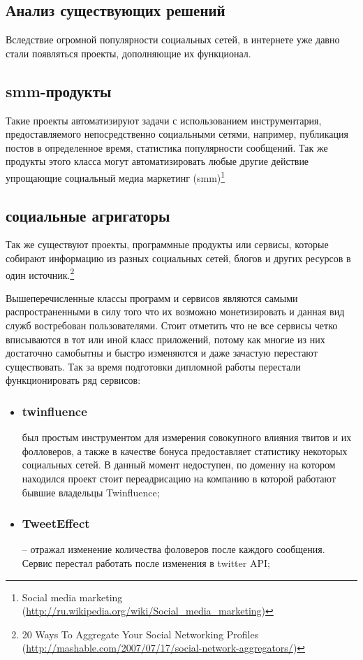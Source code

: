 \begin{chap1}
\section{Анализ существующих решений}
Вследствие огромной популярности социальных сетей, в интернете уже давно стали появляться проекты, дополняющие их функционал. 
\subsection{smm-продукты}
Такие проекты автоматизируют задачи с использованием инструментария, предоставляемого непосредственно социальными сетями, например, публикация постов в определенное время, статистика популярности сообщений. Так же продукты этого класса могут автоматизировать любые другие действие упрощающие социальный медиа маркетинг (smm)\footnote{Social media marketing (\url{http://ru.wikipedia.org/wiki/Social_media_marketing})}
\subsection{социальные агригаторы}
Так же существуют проекты, программные продукты или сервисы, которые собирают информацию из разных социальных сетей, блогов и других ресурсов в один источник.\footnote{20 Ways To Aggregate Your Social Networking Profiles (\url{http://mashable.com/2007/07/17/social-network-aggregators/})} 

Вышеперечисленные классы программ и сервисов являются самыми распространенными в силу того что их возможно монетизировать %
 и данная вид служб востребован пользователями. Стоит отметить что не все сервисы четко вписываются в тот или иной класс приложений, потому как многие из них достаточно самобытны и быстро изменяются и даже зачастую перестают существовать. Так за время подготовки дипломной работы перестали функционировать ряд сервисов:

\begin{itemize}
\item \subsubsection{twinfluence} был простым инструментом для измерения совокупного влияния твитов и их фолловеров, а также в качестве бонуса предоставляет статистику некоторых социальных сетей. В данный момент недоступен, по доменну на котором находился проект стоит переадрисацию на компанию в которой работают бывшие владельцы Twinfluence;
\item \subsubsection{TweetEffect} – отражал изменение количества фоловеров после каждого сообщения. Сервис перестал работать после изменения в twitter API;
\end{itemize}



\end{chap1}
